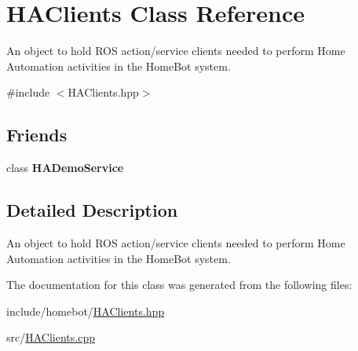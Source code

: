 \hypertarget{classHAClients}{\section{H\-A\-Clients Class Reference}
\label{classHAClients}
}


An object to hold R\-O\-S action/service clients needed to perform Home Automation activities in the Home\-Bot system.  




{\ttfamily \#include $<$H\-A\-Clients.\-hpp$>$}

\subsection*{Friends}
\begin{DoxyCompactItemize}
\item 
\hypertarget{classHAClients_a54fd12ef3575018453406e028289eada}{class {\bfseries H\-A\-Demo\-Service}}\label{classHAClients_a54fd12ef3575018453406e028289eada}

\end{DoxyCompactItemize}


\subsection{Detailed Description}
An object to hold R\-O\-S action/service clients needed to perform Home Automation activities in the Home\-Bot system. 

The documentation for this class was generated from the following files\-:\begin{DoxyCompactItemize}
\item 
include/homebot/\hyperlink{HAClients_8hpp}{H\-A\-Clients.\-hpp}\item 
src/\hyperlink{HAClients_8cpp}{H\-A\-Clients.\-cpp}\end{DoxyCompactItemize}
